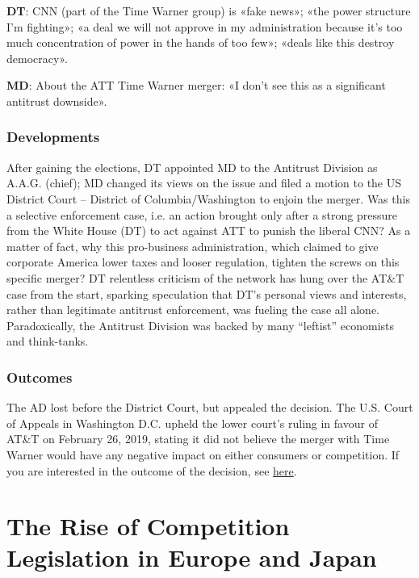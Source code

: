             \textbf{DT}: CNN (part of the Time Warner group) is «fake news»; «the power structure I’m fighting»; «a deal we will not approve in my administration because it’s too much concentration of power in the hands of too few»; «deals like this destroy democracy».
            
            \textbf{MD}: About the ATT Time Warner merger: «I don’t see this as a significant antitrust downside». 
            
        \subsubsection{Developments}

            After gaining the elections, DT appointed MD to the Antitrust Division as A.A.G. (chief);   MD changed its views on the issue and filed a motion to the US District Court – District of Columbia/Washington to enjoin the merger.   Was this a selective enforcement case, i.e. an action brought only after a strong pressure from the White House (DT) to act against ATT to punish the liberal CNN?   As a matter of fact, why this pro-business administration, which claimed to give corporate America lower taxes and looser regulation, tighten the screws on this specific merger?   DT relentless criticism of the network has hung over the AT\&T case from the start, sparking speculation that DT’s personal views and interests, rather than legitimate antitrust enforcement, was fueling the case all alone.   Paradoxically, the Antitrust Division was backed by many “leftist” economists and think-tanks.  

        \subsubsection{Outcomes}

            The AD lost before the District Court, but appealed the decision. The U.S. Court of Appeals in Washington D.C. upheld the lower court’s ruling in favour of AT\&T on February 26, 2019, stating it did not believe the merger with Time Warner would have any negative impact on either consumers or competition. If you are interested in the outcome of the decision, see \href{https://www.cbsnews.com/news/at-t-time-warner-merger-approved-by-u-s-appeals-court-81-billion-takeover-wont-harm-competition/}{here}.

\newpage
\section{The Rise of Competition Legislation in Europe and Japan}

